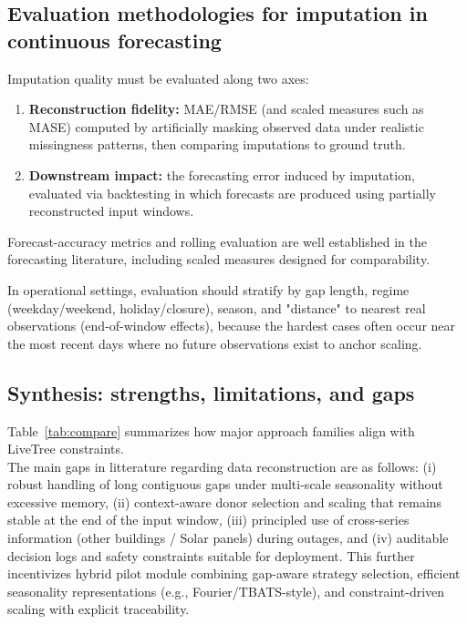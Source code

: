 \subsection{Evaluation methodologies for imputation in continuous forecasting}
Imputation quality must be evaluated along two axes:
\begin{enumerate}
\item \textbf{Reconstruction fidelity:} MAE/RMSE (and scaled measures such as MASE) computed by artificially masking observed data under realistic missingness patterns, then comparing imputations to ground truth.
\item \textbf{Downstream impact:} the forecasting error induced by imputation, evaluated via backtesting in which forecasts are produced using partially reconstructed input windows.
\end{enumerate}
Forecast-accuracy metrics and rolling evaluation are well established in the forecasting literature, including scaled measures designed for comparability.%

In operational settings, evaluation should stratify by gap length, regime (weekday/weekend, holiday/closure), season, and "distance" to nearest real observations (end-of-window effects), because the hardest cases often occur near the most recent days where no future observations exist to anchor scaling.

\subsection{Synthesis: strengths, limitations, and gaps}
Table~\ref{tab:compare} summarizes how major approach families align with LiveTree constraints.\\




The main gaps in litterature regarding data reconstruction are as follows: (i) robust handling of long contiguous gaps under multi-scale seasonality without excessive memory, (ii) context-aware donor selection and scaling that remains stable at the end of the input window, (iii) principled use of cross-series information (other buildings / Solar panels) during outages, and (iv) auditable decision logs and safety constraints suitable for deployment. This further incentivizes hybrid pilot module combining gap-aware strategy selection, efficient seasonality representations (e.g., Fourier/TBATS-style), and constraint-driven scaling with explicit traceability.%
%
